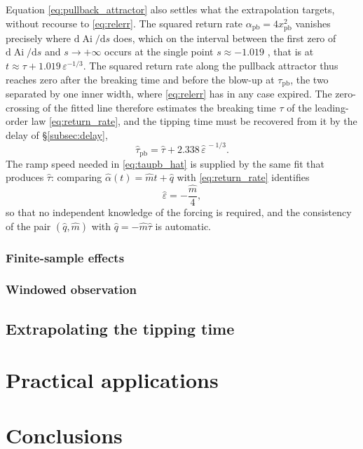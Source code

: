 \documentclass[11pt,a4paper]{article}
\theoremstyle{plain}
\theoremstyle{definition}
\theoremstyle{remark}
\newcommand{\dd}{\mathrm{d}}
\newcommand{\Ai}{\operatorname{Ai}}
\newcommand{\xpb}{x_{\mathrm{pb}}}
\newcommand{\taupb}{\tau_{\mathrm{pb}}}
\begin{document}
Equation \eqref{eq:pullback_attractor} also settles what the extrapolation targets, without recourse to \eqref{eq:relerr}.
The squared return rate $\alpha_{\mathrm{pb}}=4\xpb^{2}$ vanishes precisely where $\dd\Ai/\dd s$ does, which on the interval between the first zero of $\dd\Ai/\dd s$ and $s\to+\infty$ occurs at the single point $s\approx-1.019$ \cite[\S~$10.4$]{Abramowitz1965}, that is at $t\approx\tau+1.019\,\varepsilon^{-1/3}$.
The squared return rate along the pullback attractor thus reaches zero after the breaking time and before the blow-up at $\taupb$, the two separated by one inner width, where \eqref{eq:relerr} has in any case expired.
The zero-crossing of the fitted line therefore estimates the breaking time $\tau$ of the leading-order law \eqref{eq:return_rate}, and the tipping time must be recovered from it by the delay of \S\ref{subsec:delay},
%
\begin{equation}\label{eq:taupb_hat}
        \hat\tau_{\mathrm{pb}}=\hat\tau+2.338\,\hat\varepsilon^{\,-1/3} .
\end{equation}
%
The ramp speed needed in \eqref{eq:taupb_hat} is supplied by the same fit that produces $\hat\tau$: comparing $\hat\alpha(t)=\hat mt+\hat q$ with \eqref{eq:return_rate} identifies
%
\begin{equation}\label{eq:epshat}
        \hat\varepsilon=-\frac{\hat m}{4} ,
\end{equation}
%
so that no independent knowledge of the forcing is required, and the consistency of the pair $(\hat q,\hat m)$ with $\hat q=-\hat m\hat\tau$ is automatic.

\subsubsection{Finite-sample effects}\label{subsubsec:effects}

\subsubsection{Windowed observation}\label{subsubsec:window}

\subsection{Extrapolating the tipping time}\label{subsec:extrapolators}

\section{Practical applications}\label{sec:application}

\section{Conclusions}\label{sec:conclusion}

\printbibliography
\end{document}

